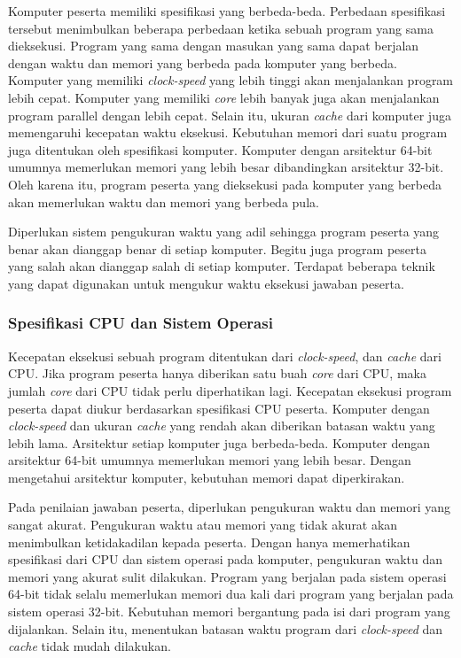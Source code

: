 \par Komputer peserta memiliki spesifikasi yang berbeda-beda. Perbedaan spesifikasi tersebut menimbulkan beberapa perbedaan ketika sebuah program yang sama dieksekusi. Program yang sama dengan masukan yang sama dapat berjalan dengan waktu dan memori yang berbeda pada komputer yang berbeda. Komputer yang memiliki \textit{clock-speed} yang lebih tinggi akan menjalankan program lebih cepat. Komputer yang memiliki \textit{core} lebih banyak juga akan menjalankan program parallel dengan lebih cepat. Selain itu, ukuran \textit{cache} dari komputer juga memengaruhi kecepatan waktu eksekusi. Kebutuhan memori dari suatu program juga ditentukan oleh spesifikasi komputer. Komputer dengan arsitektur 64-bit umumnya memerlukan memori yang lebih besar dibandingkan arsitektur 32-bit. Oleh karena itu, program peserta yang dieksekusi pada komputer yang berbeda akan memerlukan waktu dan memori yang berbeda pula.

\par Diperlukan sistem pengukuran waktu yang adil sehingga program peserta yang benar akan dianggap benar di setiap komputer. Begitu juga program peserta yang salah akan dianggap salah di setiap komputer. Terdapat beberapa teknik yang dapat digunakan untuk mengukur waktu eksekusi jawaban peserta.

\subsubsection{Spesifikasi CPU dan Sistem Operasi}

\par Kecepatan eksekusi sebuah program ditentukan dari \textit{clock-speed}, dan \textit{cache} dari CPU. Jika program peserta hanya diberikan satu buah \textit{core} dari CPU, maka jumlah \textit{core} dari CPU tidak perlu diperhatikan lagi. Kecepatan eksekusi program peserta dapat diukur berdasarkan spesifikasi CPU peserta. Komputer dengan \textit{clock-speed} dan ukuran \textit{cache} yang rendah akan diberikan batasan waktu yang lebih lama. Arsitektur setiap komputer juga berbeda-beda. Komputer dengan arsitektur 64-bit umumnya memerlukan memori yang lebih besar. Dengan mengetahui arsitektur komputer, kebutuhan memori dapat diperkirakan.

\par Pada penilaian jawaban peserta, diperlukan pengukuran waktu dan memori yang sangat akurat. Pengukuran waktu atau memori yang tidak akurat akan menimbulkan ketidakadilan kepada peserta. Dengan hanya memerhatikan spesifikasi dari CPU dan sistem operasi pada komputer, pengukuran waktu dan memori yang akurat sulit dilakukan. Program yang berjalan pada sistem operasi 64-bit tidak selalu memerlukan memori dua kali dari program yang berjalan pada sistem operasi 32-bit. Kebutuhan memori bergantung pada isi dari program yang dijalankan. Selain itu, menentukan batasan waktu program dari \textit{clock-speed} dan \textit{cache} tidak mudah dilakukan. 

